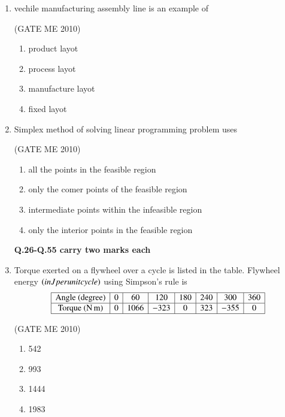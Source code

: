 \documentclass[journal,12pt,onecolumn]{IEEEtran}
\theoremstyle{remark}
\begin{document}
\begin{enumerate}
\item vechile manufacturing assembly line is an example of

  \hfill{(GATE ME 2010)}
  
\begin{multicols}{2}
    \begin{enumerate}
        \item product layot
        \item process layot
        \item manufacture layot
        \item fixed layot
    \end{enumerate}
\end{multicols}


\item Simplex method of solving linear programming problem uses

  \hfill{(GATE ME 2010)}
 
    \begin{enumerate}

\item all the points in the feasible region
\item  only the comer points of the feasible region
\item  intermediate points within the infeasible region
\item  only the interior points in the feasible region
  \end{enumerate}
 

\textbf{Q.26-Q.55 carry two marks each }

\item Torque exerted on a flywheel over a cycle is listed in the table. Flywheel energy $\left(in J per unit cycle\right)$ using Simpson's rule is 
\[
\begin{array}{|c|c|c|c|c|c|c|c|c|}
\hline
\text{Angle (degree)} & 0 & 60 & 120 & 180 & 240 & 300 & 360 \\
\hline
\text{Torque (N\,m)} & 0 & 1066 & -323 & 0 & 323 & -355 & 0 \\
\hline
\end{array}
\]

  \hfill{(GATE ME 2010)}


\begin{multicols}{4}
\begin{enumerate}
    
    \item 542
    \item 993
    \item 1444
    \item 1983
\end{enumerate}
\end{multicols}



\end{enumerate}
\end{document}
